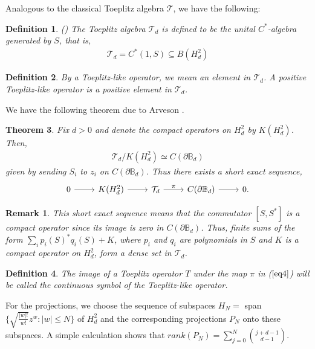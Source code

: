 \documentclass[article]{amsart}
\newtheorem{theorem}            {Theorem}[section]
\newtheorem{definition}[theorem]{Definition}
\newtheorem{remark}{Remark}
\begin{document}
Analogous to the classical Toeplitz algebra $\mathcal{T}$, we have the following:
\begin{definition} (\cite{Hartz2016})
The \textup{Toeplitz algebra} $\mathcal{T}_d$ is defined to be the unital $C^*$-algebra generated by $S$, that is,
\begin{align*}
\mathcal{T}_d = C^* (1,S) \subseteq B(H^2_d)
\end{align*}
\end{definition}
\begin{definition}
    By a \textup{Toeplitz-like operator}, we mean an element in $\mathcal{T}_d$. A \textup{positive Toeplitz-like operator} is a positive element in $\mathcal{T}_d$.
\end{definition}
We have the following theorem due to Arveson \cite{MR1668582}.
\begin{theorem}
Fix $d>0$ and denote the compact operators on $H_d^2$ by $K(H_d^2)$. Then,
   \begin{align}\label{eq4}
\mathcal{T}_d / K(H_d^2) \simeq C(\partial \mathbb{B}_d)
\end{align}
given by sending $S_i$ to $z_i$ on $C(\partial \mathbb{B}_d)$. Thus there exists a short exact sequence,
\[
\begin{tikzcd}
    0\arrow[r] & K(H_d^2) \arrow[r, ""] & \mathcal{T}_d \arrow[r, "\pi"] & C(\partial \mathbb{B}_d)\arrow[r] & 0.
\end{tikzcd}
\]
\end{theorem}
\begin{remark}
    This short exact sequence means that the commutator $[S,S^*]$ is a compact operator since its image is zero in $C(\partial \mathbb{B}_d)$. Thus, finite sums of the form $\sum_{i} p_i(S)^* q_i(S) +K$, where $p_i$ and $q_i$ are polynomials in $S$ and $K$ is a compact operator on $H_d^2$, form a dense set in $\mathcal{T}_d$.
\end{remark}
\begin{definition}
    The image of a Toeplitz operator $T$ under the map $\pi$ in ($\ref{eq4}$) will be called the continuous \textup{symbol} of the Toeplitz-like operator.
\end{definition}
For the projections, we choose the sequence of subspaces $H_N =$ span$\{\sqrt{\frac{|w|!}{w!}} z^w: |w|\leq N\}$ of $H_d^2$ and the corresponding projections $P_N$ onto these subspaces. A simple calculation shows that $rank(P_N) = \sum_{j=0}^{N} {j+d-1 \choose d-1}$. \\
\end{document}
